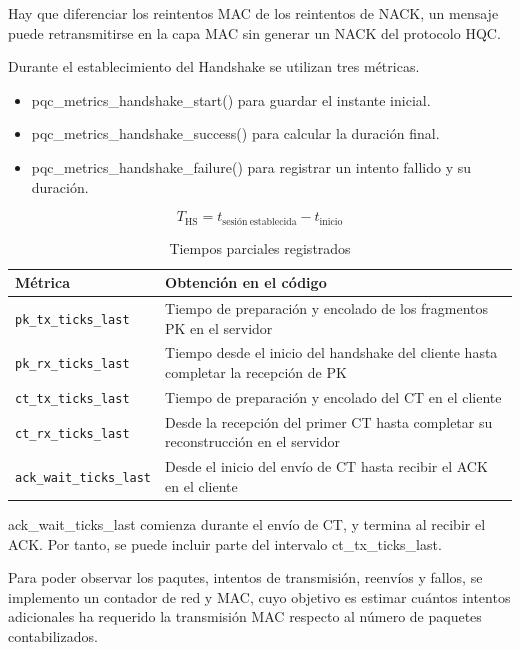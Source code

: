 Hay que diferenciar los reintentos MAC de los reintentos de NACK, un mensaje puede retransmitirse en la capa MAC sin 
generar un NACK del protocolo HQC. 

Durante el establecimiento del Handshake  se utilizan tres métricas.

\begin{itemize}
  \item pqc\_metrics\_handshake\_start() para guardar el instante inicial.
  \item pqc\_metrics\_handshake\_success() para calcular la duración final.
  \item pqc\_metrics\_handshake\_failure() para registrar un intento fallido y su duración.
\end{itemize}

\[
T_{\mathrm{HS}}=t_{\mathrm{sesión\ establecida}}-t_{\mathrm{inicio}}
\]

\begin{table}[htbp]
    \centering
    \caption{Tiempos parciales registrados}
    \label{tab:tiempos_parciales}
    \begin{tabularx}{\textwidth}{l X}
        \toprule
        \textbf{Métrica} & \textbf{Obtención en el código} \\
        \midrule
        \texttt{pk\_tx\_ticks\_last} & Tiempo de preparación y encolado de los fragmentos PK en el servidor \\
        \addlinespace
        \texttt{pk\_rx\_ticks\_last} & Tiempo desde el inicio del handshake del cliente hasta completar la recepción de PK \\
        \addlinespace
        \texttt{ct\_tx\_ticks\_last} & Tiempo de preparación y encolado del CT en el cliente \\
        \addlinespace
        \texttt{ct\_rx\_ticks\_last} & Desde la recepción del primer CT hasta completar su reconstrucción en el servidor \\
        \addlinespace
        \texttt{ack\_wait\_ticks\_last} & Desde el inicio del envío de CT hasta recibir el ACK en el cliente \\
        \bottomrule
    \end{tabularx}
\end{table}

ack\_wait\_ticks\_last comienza durante el envío de CT, y termina al recibir el ACK. Por tanto, se puede incluir parte del 
intervalo ct\_tx\_ticks\_last. 


Para poder observar los paqutes, intentos de transmisión, reenvíos y fallos, se implemento un contador de red y MAC, cuyo objetivo es 
estimar cuántos intentos adicionales ha requerido la transmisión MAC respecto al número de paquetes contabilizados. 

